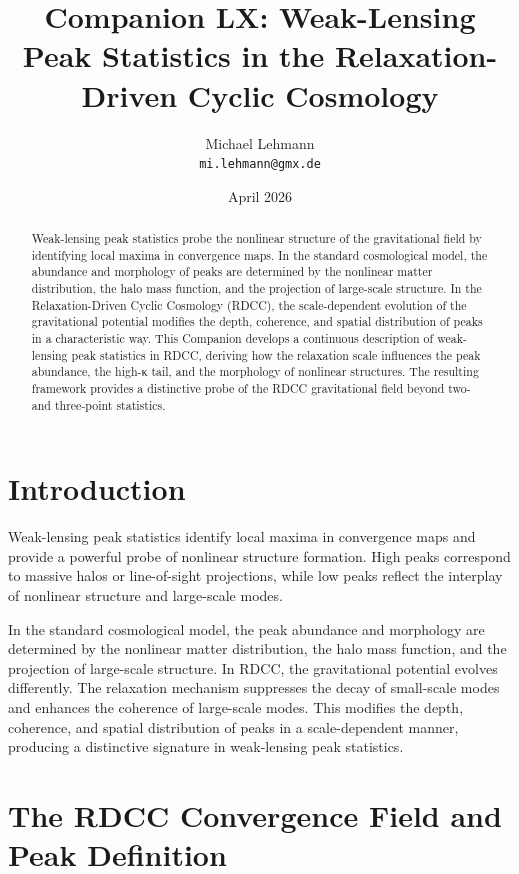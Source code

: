 \documentclass[11pt,a4paper]{article}
\title{\textbf{Companion LX: Weak-Lensing Peak Statistics in the Relaxation-Driven Cyclic Cosmology}}
\author{Michael Lehmann \\ \texttt{mi.lehmann@gmx.de}}
\date{April 2026}
\begin{document}
\maketitle

\begin{abstract}
Weak-lensing peak statistics probe the nonlinear structure of the gravitational 
field by identifying local maxima in convergence maps. In the standard 
cosmological model, the abundance and morphology of peaks are determined by the 
nonlinear matter distribution, the halo mass function, and the projection of 
large-scale structure. In the Relaxation-Driven Cyclic Cosmology (RDCC), the 
scale-dependent evolution of the gravitational potential modifies the depth, 
coherence, and spatial distribution of peaks in a characteristic way. This 
Companion develops a continuous description of weak-lensing peak statistics in 
RDCC, deriving how the relaxation scale influences the peak abundance, the 
high-κ tail, and the morphology of nonlinear structures. The resulting framework 
provides a distinctive probe of the RDCC gravitational field beyond two- and 
three-point statistics.
\end{abstract}
\section{Introduction}

Weak-lensing peak statistics identify local maxima in convergence maps and provide 
a powerful probe of nonlinear structure formation. High peaks correspond to massive 
halos or line-of-sight projections, while low peaks reflect the interplay of 
nonlinear structure and large-scale modes.

In the standard cosmological model, the peak abundance and morphology are 
determined by the nonlinear matter distribution, the halo mass function, and the 
projection of large-scale structure. In RDCC, the gravitational potential evolves 
differently. The relaxation mechanism suppresses the decay of small-scale modes and 
enhances the coherence of large-scale modes. This modifies the depth, coherence, 
and spatial distribution of peaks in a scale-dependent manner, producing a 
distinctive signature in weak-lensing peak statistics.
\section{The RDCC Convergence Field and Peak Definition}
\end{document}
